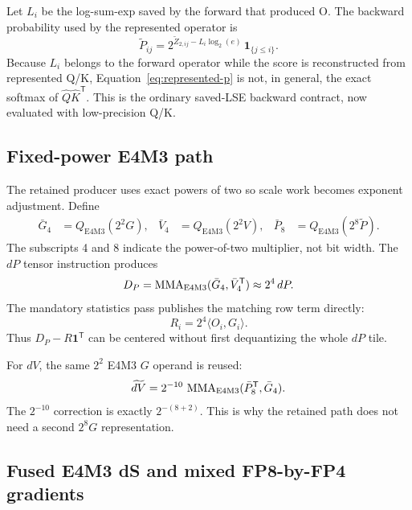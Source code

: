 Let $L_i$ be the log-sum-exp saved by the forward that produced O.  The
backward probability used by the represented operator is
\begin{equation}
  \widetilde P_{ij}
  =2^{\widetilde Z_{2,ij}-L_i\log_2(e)}\,\mathbf 1_{\{j\le i\}}.
  \label{eq:represented-p}
\end{equation}
Because $L_i$ belongs to the forward operator while the score is reconstructed
from represented Q/K, Equation~\ref{eq:represented-p} is not, in general,
the exact softmax of $\widehat Q\widehat K^\mathsf T$.  This is the ordinary
saved-LSE backward contract, now evaluated with low-precision Q/K.

\subsection{Fixed-power E4M3 path}

The retained producer uses exact powers of two so scale work becomes exponent
adjustment.  Define
\begin{align}
  \bar G_4 &= Q_{\mathrm{E4M3}}(2^2G),&
  \bar V_4 &= Q_{\mathrm{E4M3}}(2^2V),&
  \bar P_8 &= Q_{\mathrm{E4M3}}(2^8\widetilde P).
  \label{eq:fp8-operands}
\end{align}
The subscripts 4 and 8 indicate the power-of-two multiplier, not bit width.
The $dP$ tensor instruction produces
\begin{equation}
  D_P=\operatorname{MMA}_{\mathrm{E4M3}}(\bar G_4,\bar V_4^\mathsf T)
  \approx 2^4\,dP.
  \label{eq:scaled-dp}
\end{equation}
The mandatory statistics pass publishes the matching row term directly:
\begin{equation}
  R_i=2^4\langle O_i,G_i\rangle.
  \label{eq:scaled-row-term}
\end{equation}
Thus $D_P-R\mathbf1^\mathsf T$ can be centered without first dequantizing the
whole $dP$ tile.

For $dV$, the same $2^2$ E4M3 $G$ operand is reused:
\begin{equation}
  \widetilde{dV}
  =2^{-10}\,
    \operatorname{MMA}_{\mathrm{E4M3}}(\bar P_8^\mathsf T,\bar G_4).
  \label{eq:represented-dv}
\end{equation}
The $2^{-10}$ correction is exactly $2^{-(8+2)}$.  This is why the retained
path does not need a second $2^8G$ representation.

\subsection{Fused E4M3 dS and mixed FP8-by-FP4 gradients}

